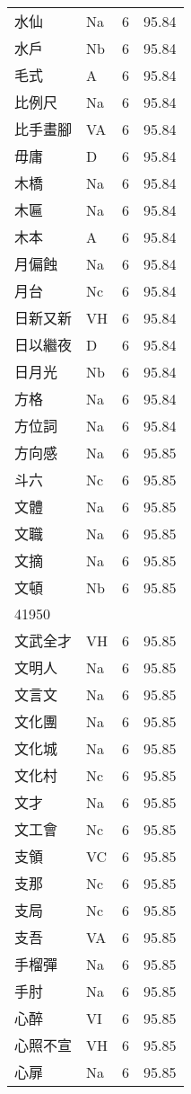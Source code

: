\documentclass[twocolumn]{book}
\begin{document}
\begin{supertabular}{llrr}
水仙 & Na & 6 &  95.84\\
水戶 & Nb & 6 &  95.84\\
毛式 & A & 6 &  95.84\\
比例尺 & Na & 6 &  95.84\\
比手畫腳 & VA & 6 &  95.84\\
毋庸 & D & 6 &  95.84\\
木橋 & Na & 6 &  95.84\\
木匾 & Na & 6 &  95.84\\
木本 & A & 6 &  95.84\\
月偏蝕 & Na & 6 &  95.84\\
月台 & Nc & 6 &  95.84\\
日新又新 & VH & 6 &  95.84\\
日以繼夜 & D & 6 &  95.84\\
日月光 & Nb & 6 &  95.84\\
方格 & Na & 6 &  95.84\\
方位詞 & Na & 6 &  95.84\\
方向感 & Na & 6 &  95.85\\
斗六 & Nc & 6 &  95.85\\
文體 & Na & 6 &  95.85\\
文職 & Na & 6 &  95.85\\
文摘 & Na & 6 &  95.85\\
文頓 & Nb & 6 &  95.85\\
41950\\
文武全才 & VH & 6 &  95.85\\
文明人 & Na & 6 &  95.85\\
文言文 & Na & 6 &  95.85\\
文化團 & Na & 6 &  95.85\\
文化城 & Na & 6 &  95.85\\
文化村 & Nc & 6 &  95.85\\
文才 & Na & 6 &  95.85\\
文工會 & Nc & 6 &  95.85\\
支領 & VC & 6 &  95.85\\
支那 & Nc & 6 &  95.85\\
支局 & Nc & 6 &  95.85\\
支吾 & VA & 6 &  95.85\\
手榴彈 & Na & 6 &  95.85\\
手肘 & Na & 6 &  95.85\\
心醉 & VI & 6 &  95.85\\
心照不宣 & VH & 6 &  95.85\\
心扉 & Na & 6 &  95.85\\

\end{supertabular}
\end{document}
